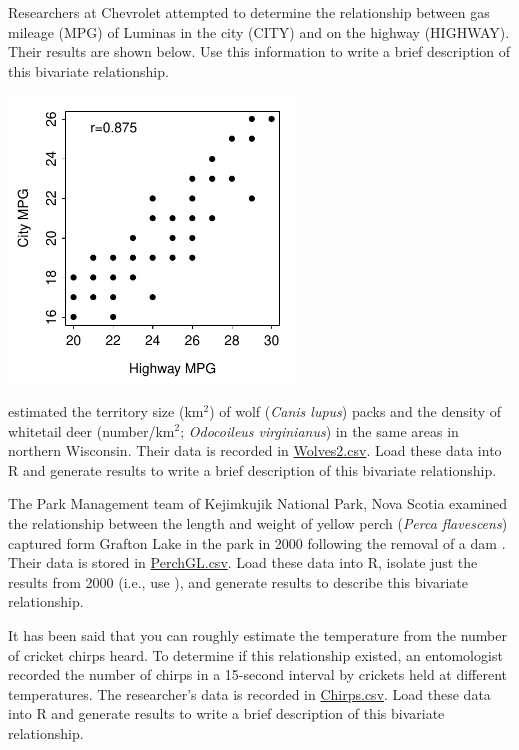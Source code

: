 \documentclass[10pt,openany]{book}\usepackage[]{graphicx}\usepackage[]{color}
\begin{document}
\begin{exsection}
  \item \label{revex:qbEDAMPG} Researchers at Chevrolet attempted to determine the relationship between gas mileage (MPG) of Luminas in the city (CITY) and on the highway (HIGHWAY).  Their results are shown below.  Use this information to write a brief description of this bivariate relationship.

\begin{center}
  \includegraphics[width=3in]{Figs/ScatLumina-1}
\end{center}

  \item \label{revex:qbEDAMlad} \rhw{} \cite{Mladenoffetal1997} estimated the territory size (km$^{2}$) of wolf (\textit{Canis lupus}) packs and the density of whitetail deer (number/km$^{2}$; \textit{Odocoileus virginianus}) in the same areas in northern Wisconsin.  Their data is recorded in \href{https://raw.githubusercontent.com/droglenc/NCData/master/Wolves2.csv}{Wolves2.csv}.  Load these data into R and generate results to write a brief description of this bivariate relationship. 

  \item \label{revex:qbEDAPerch} \rhw{} The Park Management team of Kejimkujik National Park, Nova Scotia examined the relationship between the length and weight of yellow perch (\emph{Perca flavescens}) captured form Grafton Lake in the park in 2000 following the removal of a dam \citep{Brylinsky2001}.  Their data is stored in \href{https://raw.githubusercontent.com/droglenc/NCData/master/PerchGL.csv}{PerchGL.csv}.  Load these data into R, isolate just the results from 2000 (i.e., use ), and generate results to describe this bivariate relationship.  

  \item \label{revex:qbEDACrckt} \rhw{} It has been said that you can roughly estimate the temperature from the number of cricket chirps heard.  To determine if this relationship existed, an entomologist recorded the number of chirps in a 15-second interval by crickets held at different temperatures.  The researcher's data is recorded in \href{https://raw.githubusercontent.com/droglenc/NCData/master/Chirps.csv}{Chirps.csv}.  Load these data into R and generate results to write a brief description of this bivariate relationship. 


\end{exsection}
\end{document}
